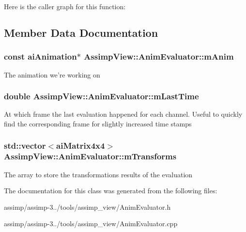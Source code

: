 Here is the caller graph for this function\+:




\subsection{Member Data Documentation}
\hypertarget{class_assimp_view_1_1_anim_evaluator_a0e81ddc2aaa893be9854ba929238072f}{
\subsubsection[{m\+Anim}]{\setlength{\rightskip}{0pt plus 5cm}const {\bf ai\+Animation}$\ast$ Assimp\+View\+::\+Anim\+Evaluator\+::m\+Anim\hspace{0.3cm}{\ttfamily [protected]}}}\label{class_assimp_view_1_1_anim_evaluator_a0e81ddc2aaa893be9854ba929238072f}
The animation we're working on \hypertarget{class_assimp_view_1_1_anim_evaluator_a5291e158522c7a8e0573fc9fa6a9b82b}{
\subsubsection[{m\+Last\+Time}]{\setlength{\rightskip}{0pt plus 5cm}double Assimp\+View\+::\+Anim\+Evaluator\+::m\+Last\+Time\hspace{0.3cm}{\ttfamily [protected]}}}\label{class_assimp_view_1_1_anim_evaluator_a5291e158522c7a8e0573fc9fa6a9b82b}
At which frame the last evaluation happened for each channel. Useful to quickly find the corresponding frame for slightly increased time stamps \hypertarget{class_assimp_view_1_1_anim_evaluator_ac9a0ebeb03d26956953ddb0001d0544a}{
\subsubsection[{m\+Transforms}]{\setlength{\rightskip}{0pt plus 5cm}std\+::vector$<${\bf ai\+Matrix4x4}$>$ Assimp\+View\+::\+Anim\+Evaluator\+::m\+Transforms\hspace{0.3cm}{\ttfamily [protected]}}}\label{class_assimp_view_1_1_anim_evaluator_ac9a0ebeb03d26956953ddb0001d0544a}
The array to store the transformations results of the evaluation 

The documentation for this class was generated from the following files\+:\begin{DoxyCompactItemize}
\item 
assimp/assimp-\/3../tools/assimp\+\_\+view/Anim\+Evaluator.\+h\item 
assimp/assimp-\/3../tools/assimp\+\_\+view/Anim\+Evaluator.\+cpp\end{DoxyCompactItemize}
